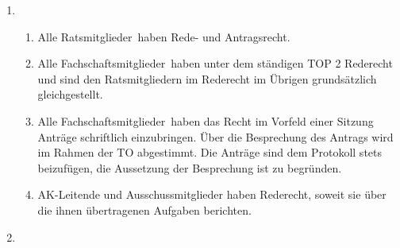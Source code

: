 \documentclass[a4paper, 12pt, ngerman]{article}
\newcommand{\rat}{FSR}
\newcommand{\mitglieder}{Ratsmitglieder}
\newcommand{\fsmitglieder}{Fachschaftsmitglieder}
\begin{document}
\begin{enumerate}[leftmargin=0cm]
	\begin{enumerate}[leftmargin=0cm]
		\item Alle \fsmitglieder~haben das Recht persönliche Erklärungen abzugeben. Die Einreichung einer persönlichen Erklärung ist bis zu zwei Tage nach Genehmigung des Protokolls möglich.
		\item Persönliche Erklärungen müssen schriftlich und digital bei der Protokollführung
		eingereicht werden. Sie sollen eine Länge von zwei DIN A4-Seiten nicht überschreiten.
		\item Betroffene dürfen in einer persönlichen Erklärung nicht zur Sache sprechen, sondern nur
		Äußerungen, die in der Aussprache in Bezug auf ihre Person
		gemacht wurden, zurückweisen, eigene Ausführungen richtig
		stellen oder ihre Abstimmung begründen.
		\item Die Protokollführung kann in Absprache mit der Sitzungsleitung Schwärzungen an dem Dokument vornehmen, wenn sie schutzwürdige Interessen Einzelner oder der Fachschaft bedroht sieht. Eine ungeschwärzte Version ist beim \rat~zur Einsichtnahme zu hinterlegen.
	\end{enumerate}
	
	
	\item {}
	
	\begin{enumerate}[leftmargin=0cm]
		\item Alle \mitglieder~haben Rede- und Antragsrecht.
		\item Alle \fsmitglieder~haben unter dem ständigen TOP 2 Rederecht und sind den Ratsmitgliedern im Rederecht im Übrigen grundsätzlich gleichgestellt.
		\item Alle \fsmitglieder~haben das Recht im Vorfeld einer Sitzung Anträge schriftlich einzubringen. Über die Besprechung des Antrags wird im Rahmen der TO abgestimmt. Die Anträge sind dem Protokoll stets beizufügen, die Aussetzung der Besprechung ist zu begründen.
		\item AK-Leitende und Ausschussmitglieder haben Rederecht, soweit sie über die ihnen übertragenen Aufgaben berichten.
	\end{enumerate}
	
	\item {}\label{redeordnung}
	

\end{enumerate}
\end{document}
